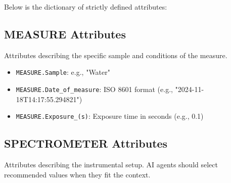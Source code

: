 \documentclass{article}
\begin{document}
Below is the dictionary of strictly defined attributes:

\subsection{MEASURE Attributes}
Attributes describing the specific sample and conditions of the measure.
\begin{itemize}
    \item \texttt{MEASURE.Sample}: e.g., "Water"
    \item \texttt{MEASURE.Date\_of\_measure}: ISO 8601 format (e.g., "2024-11-18T14:17:55.294821")
    \item \texttt{MEASURE.Exposure\_(s)}: Exposure time in seconds (e.g., 0.1)
\end{itemize}

\subsection{SPECTROMETER Attributes}
Attributes describing the instrumental setup. AI agents should select recommended values when they fit the context.
\end{document}
